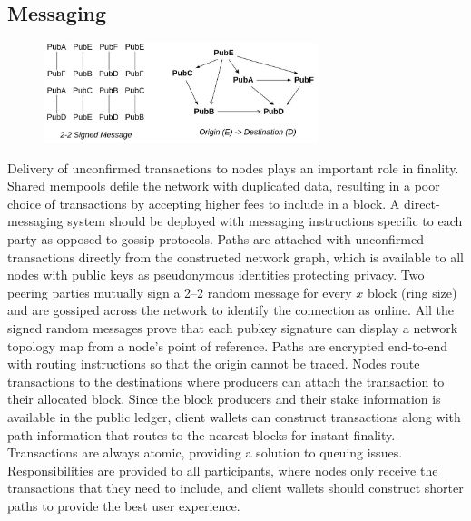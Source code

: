\documentclass[a4paper,10pt]{article}
\begin{document}
\subsection{Messaging}
\begin{figure}[h]
\begin{center}
\includegraphics[width=8cm]{topology}
\end{center}
\end{figure}
Delivery of unconfirmed transactions to nodes plays an important role in finality. Shared mempools defile the network with duplicated data, resulting in a poor choice of transactions by accepting higher fees to include in a block. A direct-messaging system should be deployed with messaging instructions specific to each party as opposed to gossip protocols. Paths are attached with unconfirmed transactions directly from the constructed network graph, which is available to all nodes with public keys as pseudonymous identities protecting privacy. Two peering parties mutually sign a 2–2 random message for every $x$ block (ring size) and are gossiped across the network to identify the connection as online. All the signed random messages prove that each pubkey signature can display a network topology map from a node's point of reference. Paths are encrypted end-to-end with routing \cite{poon2016bitcoin} instructions so that the origin cannot be traced. Nodes route transactions to the destinations where producers can attach the transaction to their allocated block. Since the block producers and their stake information is available in the public ledger, client wallets can construct transactions along with path information that routes to the nearest blocks for instant finality. Transactions are always atomic, providing a solution to queuing issues. Responsibilities are provided to all participants, where nodes only receive the transactions that they need to include, and client wallets should construct shorter paths to provide the best user experience.
\end{document}
